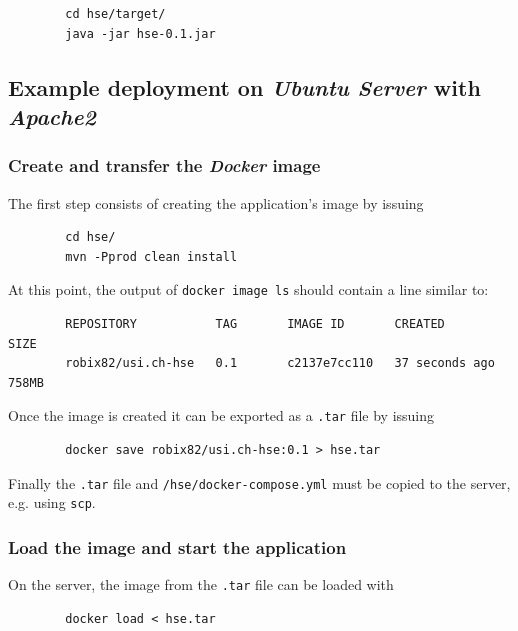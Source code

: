 \documentclass[a4paper]{usiinfbachelorproject}
\begin{document}
\begin{appendices}
        \begin{verbatim}
        cd hse/target/
        java -jar hse-0.1.jar
        \end{verbatim}

        \subsection{Example deployment on \emph{Ubuntu Server} with \emph{Apache2}}

        \subsubsection{Create and transfer the \emph{Docker} image}

        The first step consists of creating the application's image by issuing

        \begin{verbatim}
        cd hse/
        mvn -Pprod clean install
        \end{verbatim}

        At this point, the output of \texttt{docker image ls} should contain a line similar to:

        \begin{verbatim}
        REPOSITORY           TAG       IMAGE ID       CREATED             SIZE
        robix82/usi.ch-hse   0.1       c2137e7cc110   37 seconds ago      758MB
        \end{verbatim}

        Once the image is created it can be exported as a \texttt{.tar} file by issuing

        \begin{verbatim}
        docker save robix82/usi.ch-hse:0.1 > hse.tar
        \end{verbatim}

        Finally the \texttt{.tar} file and \texttt{/hse/docker-compose.yml} must be copied to the server, e.g. using \texttt{scp}.

        \subsubsection{Load the image and start the application}

        On the server, the image from the \texttt{.tar} file can be loaded with

        \begin{verbatim}
        docker load < hse.tar
        \end{verbatim}


\end{appendices}
\end{document}
